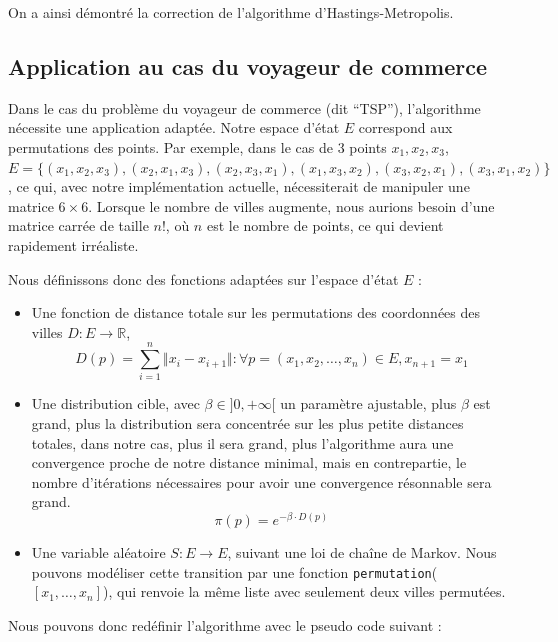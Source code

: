 \documentclass{article}
\begin{document}
On a ainsi démontré la correction de l'algorithme d'Hastings-Metropolis.

\subsection{Application au cas du voyageur de commerce}

\begin{tcolorbox}[colback=white,colframe=blue!80!black,title=Application au TSP, breakable]
Dans le cas du problème du voyageur de commerce (dit ``TSP''), l'algorithme nécessite une application adaptée.
Notre espace d'état $E$ correspond aux permutations des points. Par exemple, dans le cas de 3 points ${x_1,x_2,x_3}$,
$
E = \{(x_1,x_2,x_3), (x_2,x_1,x_3), (x_2,x_3,x_1), (x_1,x_3,x_2), (x_3,x_2,x_1), (x_3,x_1,x_2)\}
$, 
ce qui, avec notre implémentation actuelle, nécessiterait de manipuler une matrice $6 \times 6$. Lorsque le nombre de villes augmente, nous aurions besoin d'une matrice carrée de taille $n!$, où $n$ est le nombre de points, ce qui devient rapidement irréaliste.

Nous définissons donc des fonctions adaptées sur l'espace d'état $E$ : \begin{itemize} \item Une fonction de distance totale sur les permutations des coordonnées des villes $ D : E \to \mathbb{R} $,
    \[ D(p) = \sum_{i = 1}^{n} \Vert x_i - x_{i+1}\Vert : \forall p = (x_1,x_2,\ldots , x_n) \in E, x_{n+1} = x_{1}\]

    \item Une distribution cible, avec $\beta \in ]0,+\infty[$ un paramètre ajustable, plus $\beta$ est grand, plus la distribution sera concentrée sur les plus petite distances totales, dans notre cas, plus il sera grand, plus l'algorithme aura une convergence proche de notre distance minimal, mais en contrepartie, le nombre d'itérations nécessaires pour avoir une convergence résonnable sera grand.
    \[ \pi(p) = e^{-\beta \cdot D(p)} \]
    
    \item Une variable aléatoire $S: E \to E$, suivant une loi de chaîne de Markov.  
    Nous pouvons modéliser cette transition par une fonction \texttt{permutation}( $[x_1, \ldots, x_n]$), qui renvoie la même liste avec seulement deux villes permutées. 
\end{itemize}
\end{tcolorbox}

Nous pouvons donc redéfinir l'algorithme avec le pseudo code suivant : \\
\end{document}
